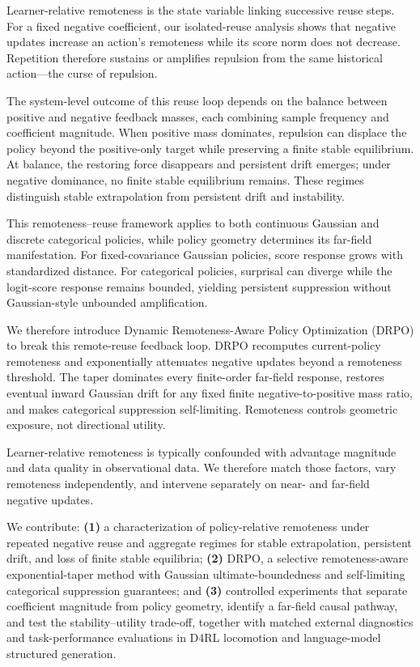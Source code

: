 \documentclass{article}
\theoremstyle{plain}
\theoremstyle{definition}
\theoremstyle{remark}
\begin{document}
Learner-relative remoteness is the state variable linking successive reuse steps. For a fixed negative coefficient, our isolated-reuse analysis shows that negative updates increase an action's remoteness while its score norm does not decrease. Repetition therefore sustains or amplifies repulsion from the same historical action---the curse of repulsion.

The system-level outcome of this reuse loop depends on the balance between positive and negative feedback masses, each combining sample frequency and coefficient magnitude. When positive mass dominates, repulsion can displace the policy beyond the positive-only target while preserving a finite stable equilibrium. At balance, the restoring force disappears and persistent drift emerges; under negative dominance, no finite stable equilibrium remains. These regimes distinguish stable extrapolation from persistent drift and instability.

This remoteness--reuse framework applies to both continuous Gaussian and discrete categorical policies, while policy geometry determines its far-field manifestation. For fixed-covariance Gaussian policies, score response grows with standardized distance. For categorical policies, surprisal can diverge while the logit-score response remains bounded, yielding persistent suppression without Gaussian-style unbounded amplification.

We therefore introduce Dynamic Remoteness-Aware Policy Optimization (DRPO) to break this remote-reuse feedback loop. DRPO recomputes current-policy remoteness and exponentially attenuates negative updates beyond a remoteness threshold. The taper dominates every finite-order far-field response, restores eventual inward Gaussian drift for any fixed finite negative-to-positive mass ratio, and makes categorical suppression self-limiting. Remoteness controls geometric exposure, not directional utility.

Learner-relative remoteness is typically confounded with advantage magnitude and data quality in observational data. We therefore match those factors, vary remoteness independently, and intervene separately on near- and far-field negative updates.

We contribute: \textbf{(1)} a characterization of policy-relative remoteness under repeated negative reuse and aggregate regimes for stable extrapolation, persistent drift, and loss of finite stable equilibria; \textbf{(2)} DRPO, a selective remoteness-aware exponential-taper method with Gaussian ultimate-boundedness and self-limiting categorical suppression guarantees; and \textbf{(3)} controlled experiments that separate coefficient magnitude from policy geometry, identify a far-field causal pathway, and test the stability--utility trade-off, together with matched external diagnostics and task-performance evaluations in D4RL locomotion and language-model structured generation.
\end{document}
